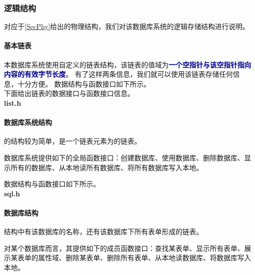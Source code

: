 \documentclass{article}
\begin{document}
\begin{spacing}{2}
        \subsubsection{逻辑结构}
            对应于\ref{SecPhy}给出的物理结构，我们对该数据库系统的逻辑存储结构进行说明。
            \paragraph{基本链表}
                本数据库系统使用自定义的链表结构，该链表的值域为\textbf{\textcolor{darkblue}{一个空指针与该空指针指向内容的有效字节长度}}。
                有了这样两条信息，我们就可以使用该链表存储任何信息，十分方便。
数据结构与函数接口如下所示。\\
                下面给出链表的数据接口与函数接口信息。\\
                \textbf{list.h}
                \begin{spacing}{1.15}
                
                \end{spacing}
            \paragraph{数据库系统结构}
                的结构较为简单，是一个链表元素为的链表。

                数据库系统提供如下的全局函数接口：创建数据库、使用数据库、删除数据库、显示所有的数据库、从本地读所有数据库、将所有数据库写入本地。
                
                数据结构与函数接口如下所示。\\
                \textbf{sql.h}
                \begin{spacing}{1.15}
                
                \end{spacing}

            \paragraph{数据库结构}
                结构中有该数据库的名称，还有该数据库下所有表单形成的链表。

                对某个数据库而言，其提供如下的成员函数接口：查找某表单、显示所有表单、展示某表单的属性域、删除某表单、删除所有表单、从本地读数据库、将数据库写入本地。


\end{spacing}
\end{document}

